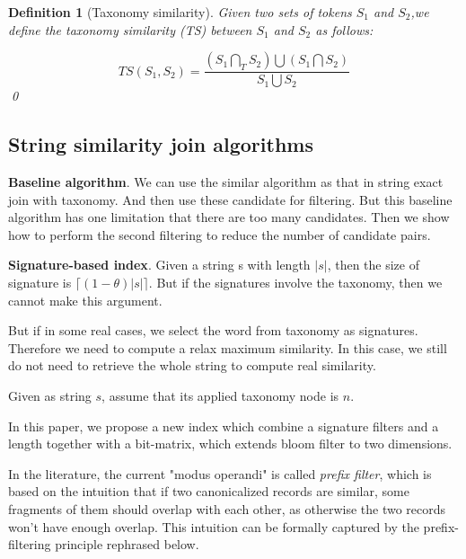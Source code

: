 \documentclass{sig-alternate}
\newtheorem{defi}[theorem]{Definition}
\newif\ifqedwritten
\newenvironment{definition}[1][]{\begin{defi}[#1]\upshape\qedwrittenfalse}{\qedhere\end{defi}}
\newcommand{\qedhere}{\ifqedwritten\else\ifmmode\tag*{\qed}\else\hfill\qed\fi\global\qedwrittentrue\fi}
\begin{document}
\begin{definition}[Taxonomy similarity]   Given two sets of tokens $S_1$ and $S_2$,we define the taxonomy similarity (TS) between $S_1$ and $S_2$ as follows:

\begin{equation}
TS(S_1,S_2)=  \frac{(S_1 \bigcap_T S_2) \bigcup (S_1 \bigcap S_2) }{S_1 \bigcup S_2}
\end{equation} \end{definition}

\subsection{String similarity join algorithms}





\textbf{Baseline algorithm}. We can use the similar algorithm as that in string exact join with taxonomy. And then use these candidate for filtering. But this baseline algorithm has one limitation that there are too many candidates. Then we show how to perform the second filtering to reduce the number of candidate pairs.

\textbf{Signature-based index}. Given a string s with length $|s|$, then the size of signature is $\lceil (1-\theta)|s| \rceil$. But if the signatures involve the taxonomy, then we cannot make this argument.

But if in some real cases, we select the word from taxonomy as signatures. Therefore we need to compute a relax maximum similarity. In this case, we still do not need to retrieve the whole string to compute real similarity.

Given as string $s$, assume that its applied taxonomy node is $n$.

In this paper, we propose a new index which combine a signature filters and a length together with a bit-matrix, which extends bloom filter to two dimensions.

In the literature, the current "modus operandi" is called \textit{prefix filter}, which is based on the intuition that if two canonicalized records are similar, some fragments of them should overlap with each other, as otherwise the two records
won't have enough overlap. This intuition can be formally captured by the prefix-filtering
principle \cite{conf/icde/ChaudhuriGK06} rephrased below.
\end{document}
